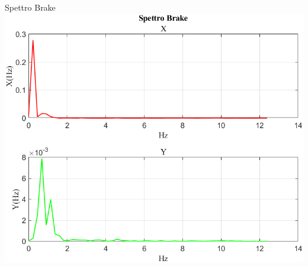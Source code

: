 \documentclass[beamer]{standalone}
\begin{document}
	\begin{frame}{{Spettro Brake}}
		\centering\includegraphics[height=.8\textheight]{figure/Vel/Trasformata/Spettro Brake}
	\end{frame}
	
\end{document}
